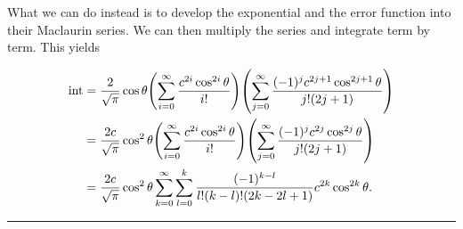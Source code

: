\documentclass{article}
\begin{document}
\begin{multicols}{2}
What we can do instead is to develop the exponential and the error function into their Maclaurin series. We can then multiply the series and integrate term by term. This yields

\begin{align*}
    \text{int} &= \frac{2}{\sqrt{\pi}}\cos\theta\qty(\sum_{i=0}^\infty\frac{c^{2i}\cos^{2i}\theta}{i!})\qty(\sum_{j=0}^\infty\frac{(-1)^jc^{2j+1}\cos^{2j+1}\theta}{j!(2j+1)})\\
    &= \frac{2c}{\sqrt{\pi}}\cos^2\theta\qty(\sum_{i=0}^\infty\frac{c^{2i}\cos^{2i}\theta}{i!})\qty(\sum_{j=0}^\infty\frac{(-1)^jc^{2j}\cos^{2j}\theta}{j!(2j+1)})\\
    &= \frac{2c}{\sqrt{\pi}}\cos^2\theta\sum_{k=0}^\infty\sum_{l=0}^k\frac{(-1)^{k-l}}{l!(k-l)!(2k-2l+1)}c^{2k}\cos^{2k}\theta.
\end{align*}

\end{multicols}
\centering
\rule{0.66\textwidth}{0.4pt}
\end{document}
